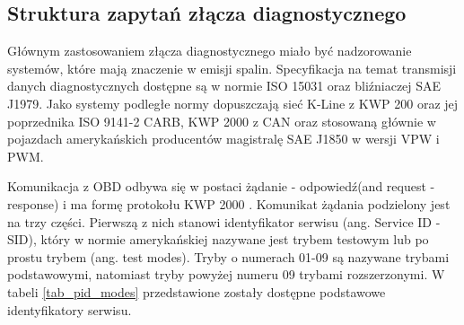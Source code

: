 \documentclass[12pt]{article} %
\numberwithin{equation}{subsection}
\numberwithin{figure}{section}
\numberwithin{table}{section}
\begin{document}
		\newpage
		
		\subsection{Struktura zapytań złącza diagnostycznego}
		
		\hspace{0.5cm}Głównym zastosowaniem złącza diagnostycznego miało być nadzorowanie systemów, które mają znaczenie w emisji spalin. Specyfikacja na temat transmisji danych diagnostycznych dostępne są w normie ISO 15031 oraz bliźniaczej SAE J1979. Jako systemy podległe normy dopuszczają sieć K-Line z KWP 200 oraz jej poprzednika ISO 9141-2 CARB, KWP 2000 z CAN oraz stosowaną głównie w pojazdach amerykańskich producentów magistralę SAE J1850 w wersji VPW i PWM.
		
		Komunikacja z OBD odbywa się w postaci żądanie - odpowiedź(and request - response) i ma formę protokołu KWP 2000 \cite{Schmidgall08}. Komunikat żądania podzielony jest na trzy części. Pierwszą z nich stanowi identyfikator serwisu (ang. Service ID - SID), który w normie amerykańskiej nazywane jest trybem testowym lub po prostu trybem (ang. test modes). Tryby o numerach 01-09 są nazywane trybami podstawowymi, natomiast tryby powyżej numeru 09 trybami rozszerzonymi\cite{Merkisz02}. W tabeli \ref{tab_pid_modes} przedstawione zostały dostępne podstawowe identyfikatory serwisu.
		
\end{document}
